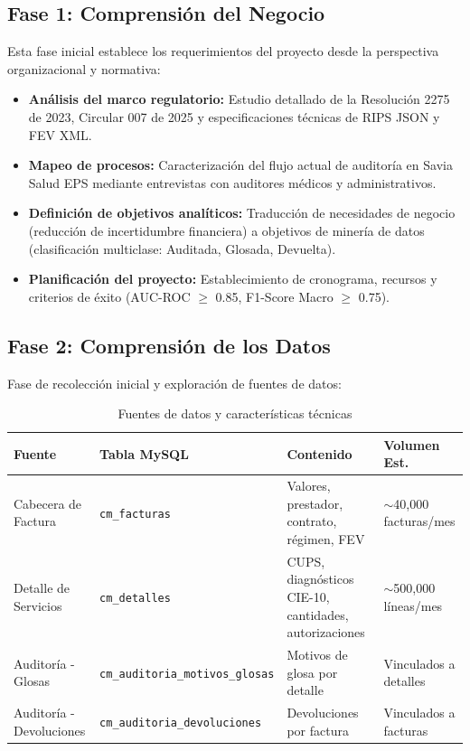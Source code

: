 \documentclass[12pt,letterpaper]{report}
\newcommand{\idb}{\discretionary{}{}{}}
\begin{document}
\subsection{Fase 1: Comprensión del Negocio}

Esta fase inicial establece los requerimientos del proyecto desde la perspectiva organizacional y normativa:

\begin{itemize}
    \item \textbf{Análisis del marco regulatorio:} Estudio detallado de la Resolución 2275 de 2023, Circular 007 de 2025 y especificaciones técnicas de RIPS JSON y FEV XML.
    \item \textbf{Mapeo de procesos:} Caracterización del flujo actual de auditoría en Savia Salud EPS mediante entrevistas con auditores médicos y administrativos.
    \item \textbf{Definición de objetivos analíticos:} Traducción de necesidades de negocio (reducción de incertidumbre financiera) a objetivos de minería de datos (clasificación multiclase: Auditada, Glosada, Devuelta).
    \item \textbf{Planificación del proyecto:} Establecimiento de cronograma, recursos y criterios de éxito (AUC-ROC $\geq$ 0.85, F1-Score Macro $\geq$ 0.75).
\end{itemize}

\subsection{Fase 2: Comprensión de los Datos}

Fase de recolección inicial y exploración de fuentes de datos:

\begin{table}[H]
\centering
\caption{Fuentes de datos y características técnicas}
\label{tab:fuentes}
\small
\begin{tabular}{@{}p{2.7cm}p{4.1cm}p{4.2cm}p{3.1cm}@{}}
\toprule
\textbf{Fuente} & \textbf{Tabla MySQL} & \textbf{Contenido} & \textbf{Volumen Est.} \\
\midrule
Cabecera de Factura & \texttt{cm\_facturas} & Valores, prestador, contrato, régimen, FEV & $\sim$40,000 facturas/mes \\
Detalle de Servicios & \texttt{cm\_detalles} & CUPS, diagnósticos CIE-10, cantidades, autorizaciones & $\sim$500,000 líneas/mes \\
Auditoría - Glosas & \texttt{cm\_auditoria\_\idb motivos\_\idb glosas} & Motivos de glosa por detalle & Vinculados a detalles \\
Auditoría - Devoluciones & \texttt{cm\_auditoria\_\idb devoluciones} & Devoluciones por factura & Vinculados a facturas \\
\bottomrule
\end{tabular}
\end{table}
\end{document}
